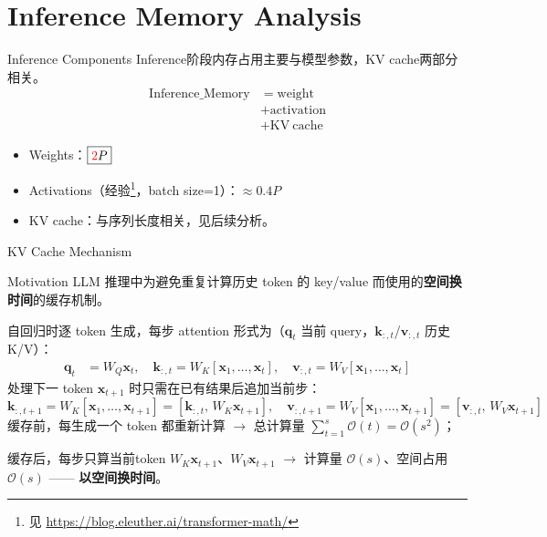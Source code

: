 \documentclass[aspectratio=169]{beamer}
\newcommand{\redtwo}{\textcolor{red}{2}}
\begin{document}
\section{Inference Memory Analysis}

\begin{frame}{Inference Components}
  Inference阶段内存占用主要与模型参数，KV cache两部分相关。
    \begin{align}
    \mathrm{Inference\_Memory}&= \mathrm{weight}\\
    &+ \mathrm{activation}\\
    &+ \mathrm{KV\ cache}
  \end{align}
  \begin{itemize}
    \item Weights：$\boxed{\redtwo P}$
    \item Activations（经验\footnote{见 \url{https://blog.eleuther.ai/transformer-math/}}，batch size=1）：$\approx 0.4P$
    \item KV cache：与序列长度相关，见后续分析。
  \end{itemize}
\end{frame}


\begin{frame}{KV Cache Mechanism}
  \small
  \begin{block}{Motivation}
      LLM 推理中为避免重复计算历史 token 的 key/value 而使用的\textbf{空间换时间}的缓存机制。
  \end{block}

  自回归时逐 token 生成，每步 attention 形式为（$\mathbf{q}_t$ 当前 query，$\mathbf{k}_{:,t}$/$\mathbf{v}_{:,t}$ 历史 K/V）：
  \begin{align*}
    \mathbf{q}_t &= W_Q\mathbf{x}_t,\quad
    \mathbf{k}_{:,t} = W_K[\mathbf{x}_1,\ldots,\mathbf{x}_t],\quad
    \mathbf{v}_{:,t} = W_V[\mathbf{x}_1,\ldots,\mathbf{x}_t]
  \end{align*}
  处理下一 token $\mathbf{x}_{t+1}$ 时只需在已有结果后追加当前步：
  \begin{equation*}
    \mathbf{k}_{:,t+1} = W_K[\mathbf{x}_1,\ldots,\mathbf{x}_{t+1}]=[\mathbf{k}_{:,t},\, W_K\mathbf{x}_{t+1}],\quad
    \mathbf{v}_{:,t+1} = W_V[\mathbf{x}_1,\ldots,\mathbf{x}_{t+1}]=[\mathbf{v}_{:,t},\, W_V\mathbf{x}_{t+1}]
  \end{equation*}
  缓存前，每生成一个 token 都重新计算 $\to$ 总计算量 $\sum_{t=1}^s \mathcal{O}(t) = \mathcal{O}(s^2)$；
  
  缓存后，每步只算当前token $W_K\mathbf{x}_{t+1}$、$W_V\mathbf{x}_{t+1}$ $\to$ 计算量 $\mathcal{O}(s)$、空间占用 $\mathcal{O}(s)$ —— \textbf{以空间换时间}。
\end{frame}
\end{document}
